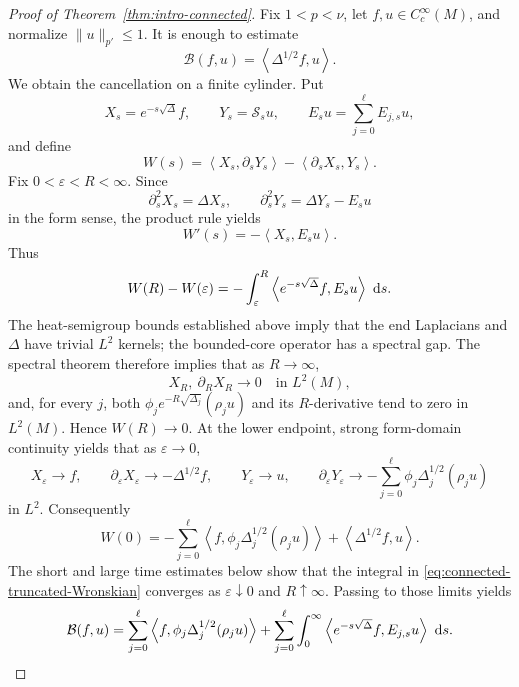 \documentclass[12pt]{amsart}
\newcommand\dd{\,{\rm d}}
\newcommand{\ip}[2]{\left\langle #1,#2\right\rangle}
\theoremstyle{remark}
\begin{document}
\begin{proof}[Proof of Theorem~\ref{thm:intro-connected}]
Fix $1<p<\nu$, let $f,u\in C_c^\infty(M)$, and normalize
$\|u\|_{p'}\leq1$.  It is enough to estimate
\[
 \mathcal B(f,u)=\ip{\Delta^{1/2}f}{u}.
\]
We obtain the cancellation on a finite cylinder.  Put
\[
 X_s=e^{-s\sqrt\Delta}f,\qquad Y_s=\mathcal S_su,\qquad
 E_su=\sum_{j=0}^{\ell}E_{j,s}u,
\]
and define
\[
 W(s)=\ip{X_s}{\partial_sY_s}-\ip{\partial_sX_s}{Y_s}.
\]
Fix \(0<\varepsilon<R<\infty\). Since
\[
 \partial_s^2X_s=\Delta X_s,\qquad
 \partial_s^2Y_s=\Delta Y_s-E_su
\]
in the form sense, the product rule yields
\[
 W'(s)=-\ip{X_s}{E_su}.
\]
Thus
\begin{equation}\label{eq:connected-truncated-Wronskian}
 W(R)-W(\varepsilon)
 =-\int_\varepsilon^R\ip{e^{-s\sqrt\Delta}f}{E_su}\,\dd s.
\end{equation}
The heat-semigroup bounds established above imply that the end Laplacians and $\Delta$ have trivial $L^2$ kernels; the bounded-core operator has a spectral gap.
The spectral theorem therefore implies that as $R\to \infty$,
\[
 X_R,\ \partial_RX_R\longrightarrow0\quad\text{in }L^2(M),
\]
and, for every \(j\), both
\(\phi_je^{-R\sqrt{\Delta_j}}(\rho_ju)\) and its \(R\)-derivative tend
to zero in \(L^2(M)\).  Hence \(W(R)\to0\).  At the lower endpoint,
strong form-domain continuity yields that as $\varepsilon \to 0$,
\[
 X_\varepsilon\to f,\qquad
 \partial_\varepsilon X_\varepsilon\to-\Delta^{1/2}f,\qquad
 Y_\varepsilon\to u,\qquad
 \partial_\varepsilon Y_\varepsilon
 \to-\sum_{j=0}^{\ell}\phi_j\Delta_j^{1/2}(\rho_ju)
\]
in \(L^2\).  Consequently
\[
 W(0)
 =-\sum_{j=0}^{\ell}\ip f{\phi_j\Delta_j^{1/2}(\rho_ju)}
   +\ip{\Delta^{1/2}f}{u}.
\]
The short and large time estimates below show that the integral in
\eqref{eq:connected-truncated-Wronskian} converges as
\(\varepsilon\downarrow0\) and \(R\uparrow\infty\).  Passing to those
limits yields
\begin{equation}\label{eq:connected-main-identity}
 \mathcal B(f,u)
 =\sum_{j=0}^{\ell}\ip f{\phi_j\Delta_j^{1/2}(\rho_ju)}
 +\sum_{j=0}^{\ell}\int_0^\infty
 \ip{e^{-s\sqrt\Delta}f}{E_{j,s}u}\,\dd s.
\end{equation}

\end{proof}
\end{document}
